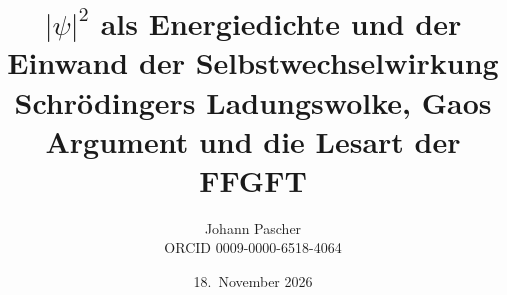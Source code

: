 \documentclass[11pt,a4paper]{report}
\title{$|\psi|^2$ als Energiedichte und der Einwand der Selbstwechselwirkung\\[0.5em]
  \large Schrödingers Ladungswolke, Gaos Argument und die Lesart der FFGFT}
\date{18.~November 2026}
\author{Johann Pascher\\\small ORCID 0009-0000-6518-4064}
\begin{document}
\renewcommand{\thechapter}{}
\renewcommand{\thesection}{\arabic{section}}
\maketitle
\tableofcontents

\end{document}
